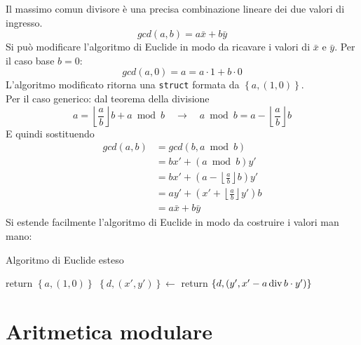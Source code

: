 Il massimo comun divisore è una precisa combinazione lineare dei due valori di ingresso.
\begin{equation*}
    gcd(a, b) = a \bar{x} + b \bar{y}
\end{equation*}
Si può modificare l'algoritmo di Euclide in modo da ricavare i valori di $
\bar{x}
$ e $
\bar{y}
$.
Per il caso base $b=0$:
\begin{equation*}
    gcd(a, 0) = a = a \cdot 1 + b \cdot 0
\end{equation*}
L'algoritmo modificato ritorna una \texttt{struct} formata da $
\left\{ a, \left( 1, 0 \right) \right\}
$.
\\
Per il caso generico:
dal teorema della divisione 
\begin{equation*}
    a = 
    \left\lfloor \frac{a}{b} \right\rfloor
    b
    +
    a \bmod b
    \quad
    \rightarrow
    \quad
    a \bmod b
    =
    a -
    \left\lfloor \frac{a}{b} \right\rfloor
    b
\end{equation*}
E quindi sostituendo
\begin{align*}
    gcd(a,b)
    &= 
    gcd(b,
        a \bmod b
    )
    \\
    &= 
    b x' + \left( 
        a \bmod b
    \right) y'
    \\
    &= 
    b x' + \left( 
        a -
        \left\lfloor \frac{a}{b} \right\rfloor
        b
    \right) y'
    \\
    &= 
    a y' +
    \left( 
        x' +
        \left\lfloor \frac{a}{b} \right\rfloor
        y'
    \right) b
    \\
    &= a \bar{x} + b \bar{y}
\end{align*}
Si estende facilmente l'algoritmo di Euclide in modo da costruire i valori man mano:
\begin{algorithm}[H]
\caption{Algoritmo di Euclide esteso}\label{alg:euclide_extended}
\begin{algorithmic}[1]
            \State return $ \left\{ a, \left( 1, 0 \right) \right\} $
        \EndIf
        \State $ \left\{ d, \left( x', y' \right) \right\} 
        \gets
        $ 
        \State return $ \left\{ d, \left( y', x' - a \operatorname*{div} b \cdot y' \right) \right\} $
    \EndProcedure
\end{algorithmic}
\end{algorithm}

\section{Aritmetica modulare}

